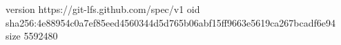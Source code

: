 version https://git-lfs.github.com/spec/v1
oid sha256:4e88954c0a7ef85eed4560344d5d765b06abf15ff9663e5619ca267bcadf6e94
size 5592480
